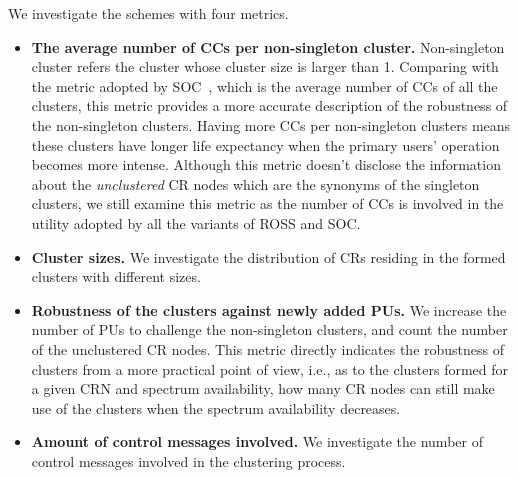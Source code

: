 \documentclass[10pt,journal,compsoc]{IEEEtran}
\theoremstyle{mytheoremstyle}
\theoremstyle{mytheoremstyle}
\theoremstyle{mytheoremstyle}
\newcommand{\eg}{e.g., }
\newcommand{\ie}{i.e., }
\begin{document}
We investigate the schemes with four metrics.

\begin{itemize}
\item \textbf{The average number of CCs per non-singleton cluster.}
Non-singleton cluster refers the cluster whose cluster size is larger than 1.
Comparing with the metric adopted by SOC~\cite{LIU_TMC11_2}, which is the average number of CCs of all the clusters, this metric provides a more accurate description of the robustness of the non-singleton clusters.
Having more CCs per non-singleton clusters means these clusters have longer life expectancy when the primary users' operation becomes more intense.
Although this metric doesn't disclose the information about the \textit{unclustered} CR nodes which are the synonyms of the singleton clusters, we still examine this metric as the number of CCs is involved in the utility adopted by all the variants of ROSS and SOC.


\item \textbf{Cluster sizes.}
We investigate the distribution of CRs residing in the formed clusters with different sizes.


\item \textbf{Robustness of the clusters against newly added PUs.}
We increase the number of PUs to challenge the non-singleton clusters, and count the number of the unclustered CR nodes.
This metric directly indicates the robustness of clusters from a more practical point of view, \ie as to the clusters formed for a given CRN and spectrum availability, how many CR nodes can still make use of the clusters when the spectrum availability decreases.


\item \textbf{Amount of control messages involved.}
We investigate the number of control messages involved in the clustering process.

\end{itemize}
\end{document}
